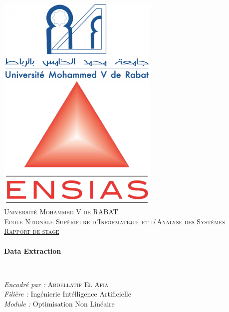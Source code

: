 \documentclass{article}
\begin{document}
 
\begin{titlepage}
  \begin{sffamily}
  \begin{center}
       \includegraphics[scale=0.5]{um5r.png}\hfill \hfill\includegraphics[scale=0.35]{ensias.png}~\\[0.75cm]
   
    \textsc{\LARGE Université Mohammed V de RABAT \\[0.15cm]
        Ecole Ntionale Supérieure d'Informatique et d'Analyse des Systèmes}\\[1cm]

    \textsc{\Large \underline{\underline{Rapport  de stage}}}\\[1cm]

    \HRule \\[0.4cm]
    { \huge \bfseries Data Extraction \\[0.4cm] }

    \HRule \\[2cm]
    \begin{minipage}{0.6\textwidth}
      \begin{flushleft} \large
        \emph{Encadré par : } \textsc{Abdellatif El Afia}\\
        \emph{Filière : } Ingénierie Intélligence Artificielle \\
        \emph{Module : }      Optimisation Non Linéaire\\
        

\end{flushleft}
\end{minipage}
\end{center}
\end{sffamily}
\end{titlepage}
\end{document}
